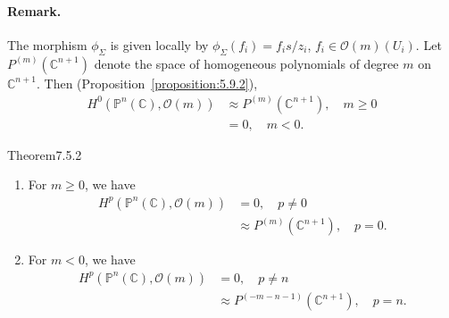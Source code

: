 \paragraph{Remark.} The morphism $\phi_\Sigma$ is given locally by $\phi_\Sigma(f_i)=f_is/z_i$, $f_i\in\mathcal O(m)(U_i)$.
Let $P^{(m)}(\mathbb C^{n+1})$ denote the space of homogeneous polynomials of degree $m$ on $\mathbb C^{n+1}$. Then (Proposition~\ref{proposition:5.9.2}),
\[
\begin{aligned}
H^0(\mathbb P^n(\mathbb C),\mathcal O(m))&\approx P^{(m)}(\mathbb C^{n+1}),\quad m\geq0\\
&=0,\quad m<0.
\end{aligned}
\]
\begin{originaltheorem}{Theorem}{7.5.2}
\begin{enumerate}[label=\arabic*.]
\item For $m\geq0$, we have
\[
\begin{aligned}
H^p(\mathbb P^n(\mathbb C),\mathcal O(m))&=0,\quad p\ne0\\
&\approx P^{(m)}(\mathbb C^{n+1}),\quad p=0.
\end{aligned}
\]
\item For $m<0$, we have
\[
\begin{aligned}
H^p(\mathbb P^n(\mathbb C),\mathcal O(m))&=0,\quad p\ne n\\
&\approx P^{(-m-n-1)}(\mathbb C^{n+1}),\quad p=n.
\end{aligned}
\]
\end{enumerate}
\end{originaltheorem}

